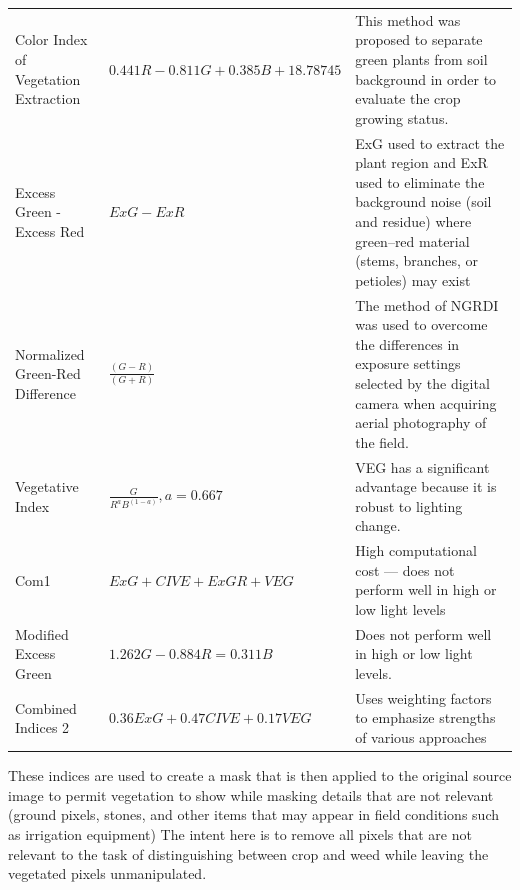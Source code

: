 \documentclass[letterpaper]{report}
\begin{document}
{{\begin{longtable}{x{\dimexpr.25\tabcolsep}
                  x{\dimexpr.35\tabcolsep}
                  x{\dimexpr.4\tabcolsep}}
		Color Index of Vegetation Extraction      
		& $0.441 R - 0.811 G + 0.385 B + 18.78745$
		& This method was proposed to separate green plants from soil background in order to evaluate the crop growing status.
\tabularnewline\addlinespace

		Excess Green - Excess Red   
		& $ExG - ExR$ 
		& ExG used to extract the plant region and ExR used to eliminate the background noise (soil and residue) where green–red material (stems, branches, or petioles) may exist
\tabularnewline\addlinespace

		Normalized Green-Red Difference    
		& $\frac {(G - R)} {(G + R)}$ 
		& The method of NGRDI was used to overcome the differences in exposure settings selected by the digital camera when acquiring aerial photography of the field. 
\tabularnewline\addlinespace

		Vegetative Index      
		& $\frac {G} {R^aB^{(1-a)}}, a = 0.667$ 
		& VEG has a significant advantage because it is robust to lighting change.
\tabularnewline\addlinespace

		Com1   
		& $ExG + CIVE + ExGR + VEG$ 
		& High computational cost --- does not perform well in high or low light levels
\tabularnewline\addlinespace

		Modified Excess Green      
		& $1.262G - 0.884R = 0.311B$ 
		& Does not perform well in high or low light levels. 
\tabularnewline\addlinespace

		Combined Indices 2      
		& $0.36ExG + 0.47CIVE + 0.17VEG$ 
		& Uses weighting factors to emphasize strengths of various approaches
\label{table:indices}
\end{longtable}
}

These indices are used to create a mask that is then applied to the original source image to permit vegetation to show while masking details that are not relevant (ground pixels, stones, and other items that may appear in field conditions such as irrigation equipment) The intent here is to remove all pixels that are not relevant to the task of distinguishing between crop and weed while leaving the vegetated pixels unmanipulated.

}
\end{document}
